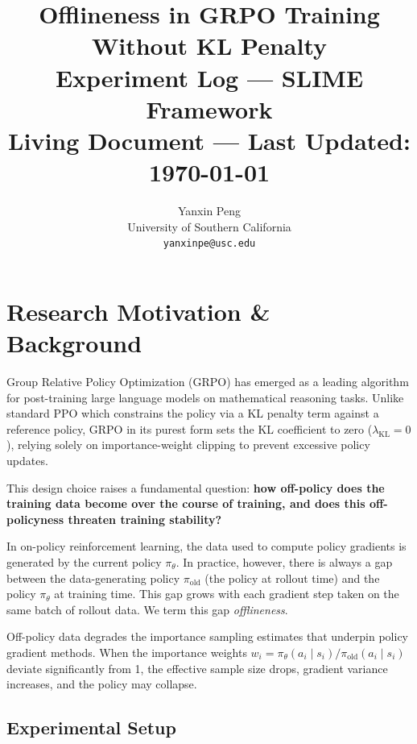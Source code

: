 \documentclass[11pt,a4paper]{article}
\title{%
  \vspace{-1cm}
  {\LARGE\bfseries\color{darkblue} Offlineness in GRPO Training\\[0.3em] Without KL Penalty}\\[0.8em]
  {\Large Experiment Log --- SLIME Framework}\\[0.5em]
  {\normalsize\color{gray} Living Document --- Last Updated: \today}
}
\author{%
  Yanxin Peng\\
  \small University of Southern California\\
  \small \texttt{yanxinpe@usc.edu}
}
\date{}
\begin{document}
\maketitle
\thispagestyle{fancy}

\tableofcontents
\newpage

\section{Research Motivation \& Background}
\label{sec:motivation}

Group Relative Policy Optimization (GRPO) has emerged as a leading algorithm for
post-training large language models on mathematical reasoning tasks. Unlike
standard PPO which constrains the policy via a KL penalty term against a
reference policy, GRPO in its purest form sets the KL coefficient to zero
($\lambda_{\mathrm{KL}} = 0$), relying solely on importance-weight clipping to
prevent excessive policy updates.

This design choice raises a fundamental question: \textbf{how off-policy does
the training data become over the course of training, and does this
off-policyness threaten training stability?}

In on-policy reinforcement learning, the data used to compute policy gradients
is generated by the current policy $\pi_\theta$. In practice, however, there is
always a gap between the data-generating policy $\pi_{\mathrm{old}}$ (the policy
at rollout time) and the policy $\pi_\theta$ at training time. This gap grows
with each gradient step taken on the same batch of rollout data. We term this
gap \emph{offlineness}.

Off-policy data degrades the importance sampling estimates that underpin policy
gradient methods. When the importance weights $w_i = \pi_\theta(a_i \mid s_i) /
\pi_{\mathrm{old}}(a_i \mid s_i)$ deviate significantly from 1, the effective
sample size drops, gradient variance increases, and the policy may collapse.

\subsection{Experimental Setup}
\end{document}
